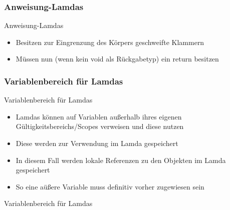 \subsubsection{Anweisung-Lamdas}
\begin{frame}{Anweisung-Lamdas}
	\begin{itemize}
		\item Besitzen zur Eingrenzung des Körpers geschweifte Klammern
		\item Müssen nun (wenn kein \alert{void} als Rückgabetyp) ein \alert{return} besitzen	
	\end{itemize}
	
	
\end{frame}

\subsubsection{Variablenbereich für Lamdas}
\begin{frame}{Variablenbereich für Lamdas}
	\begin{itemize}
		\item Lamdas können auf Variablen außerhalb ihres eigenen Gültigkeitsbereichs/Scopes verweisen und diese nutzen
		\item Diese werden zur Verwendung im Lamda gespeichert
		\item In diesem Fall werden lokale Referenzen zu den Objekten im Lamda gespeichert
		\item So eine aüßere Variable muss definitiv vorher zugewiesen sein
	\end{itemize}
	
\end{frame}

\begin{frame}{Variablenbereich für Lamdas}
	
\end{frame}

